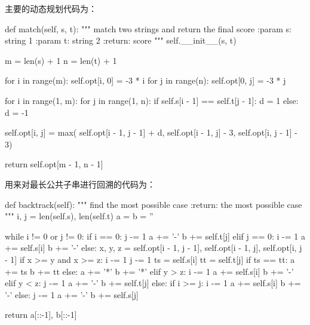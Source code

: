 \documentclass[UTF8,a4paper]{ctexart}
\begin{document}
\begin{itemize}
  主要的动态规划代码为：

  \begin{python}
    def match(self, s, t):
        """
        match two strings and return the final score
        :param s: string 1
        :param t: string 2
        :return: score
        """
        self.__init__(s, t)

        m = len(s) + 1
        n = len(t) + 1

        for i in range(m):
            self.opt[i, 0] = -3 * i
        for j in range(n):
            self.opt[0, j] = -3 * j

        for i in range(1, m):
            for j in range(1, n):
                if self.s[i - 1] == self.t[j - 1]:
                    d = 1
                else:
                    d = -1

                self.opt[i, j] = max(
                    self.opt[i - 1, j - 1] + d,
                    self.opt[i - 1, j] - 3,
                    self.opt[i, j - 1] - 3)

        return self.opt[m - 1, n - 1]
  \end{python}

  用来对最长公共子串进行回溯的代码为：

  \begin{python}
    def backtrack(self):
        """
        find the most possible case
        :return: the most possible case
        """
        i, j = len(self.s), len(self.t)
        a = b = ''

        while i != 0 or j != 0:
            if i == 0:
                j -= 1
                a += '-'
                b += self.t[j]
            elif j == 0:
                i -= 1
                a += self.s[i]
                b += '-'
            else:
                x, y, z = self.opt[i - 1, j - 1], self.opt[i - 1, j], self.opt[i, j - 1]
                if x >= y and x >= z:
                    i -= 1
                    j -= 1
                    ts = self.s[i]
                    tt = self.t[j]
                    if ts == tt:
                        a += ts
                        b += tt
                    else:
                        a += '*'
                        b += '*'
                elif y > z:
                    i -= 1
                    a += self.s[i]
                    b += '-'
                elif y < z:
                    j -= 1
                    a += '-'
                    b += self.t[j]
                else:
                    if i >= j:
                        i -= 1
                        a += self.s[i]
                        b += '-'
                    else:
                        j -= 1
                        a += '-'
                        b += self.s[j]

        return a[::-1], b[::-1]
  \end{python}

\end{itemize}
\end{document}
